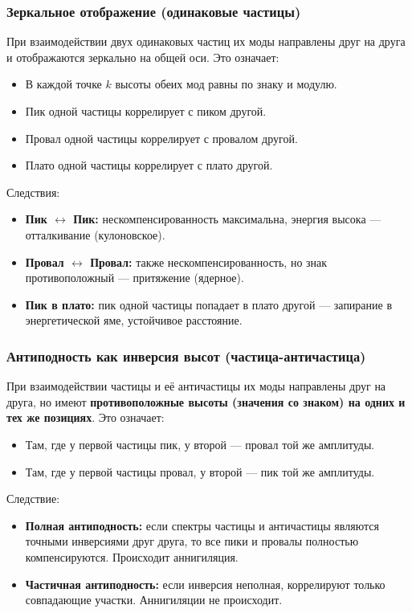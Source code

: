 \documentclass[12pt,a4paper]{article}
\begin{document}
\subsubsection{Зеркальное отображение (одинаковые частицы)}
При взаимодействии двух одинаковых частиц их моды направлены друг на друга и отображаются зеркально на общей оси. Это означает:

\begin{itemize}
    \item В каждой точке $k$ высоты обеих мод равны по знаку и модулю.
    \item Пик одной частицы коррелирует с пиком другой.
    \item Провал одной частицы коррелирует с провалом другой.
    \item Плато одной частицы коррелирует с плато другой.
\end{itemize}

Следствия:

\begin{itemize}
    \item \textbf{Пик $\leftrightarrow$ Пик:} нескомпенсированность максимальна, энергия высока --- отталкивание (кулоновское).
    \item \textbf{Провал $\leftrightarrow$ Провал:} также нескомпенсированность, но знак противоположный --- притяжение (ядерное).
    \item \textbf{Пик в плато:} пик одной частицы попадает в плато другой --- запирание в энергетической яме, устойчивое расстояние.
\end{itemize}

\subsubsection{Антиподность как инверсия высот (частица-античастица)}
При взаимодействии частицы и её античастицы их моды направлены друг на друга, но имеют \textbf{противоположные высоты (значения со знаком) на одних и тех же позициях}. Это означает:

\begin{itemize}
    \item Там, где у первой частицы пик, у второй --- провал той же амплитуды.
    \item Там, где у первой частицы провал, у второй --- пик той же амплитуды.
\end{itemize}

Следствие:

\begin{itemize}
    \item \textbf{Полная антиподность:} если спектры частицы и античастицы являются точными инверсиями друг друга, то все пики и провалы полностью компенсируются. Происходит аннигиляция.
    \item \textbf{Частичная антиподность:} если инверсия неполная, коррелируют только совпадающие участки. Аннигиляции не происходит.
\end{itemize}
\end{document}
